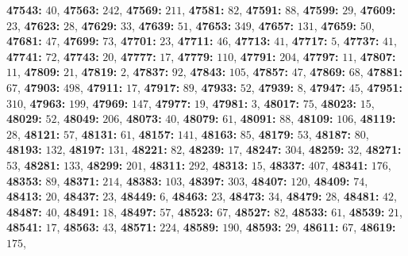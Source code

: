 \textsf{\bfseries 47543:} $40$, \textsf{\bfseries 47563:} $242$, \textsf{\bfseries 47569:} $211$, \textsf{\bfseries 47581:} $82$, \textsf{\bfseries 47591:} $88$, \textsf{\bfseries 47599:} $29$, \textsf{\bfseries 47609:} $23$, \textsf{\bfseries 47623:} $28$, \textsf{\bfseries 47629:} $33$, \textsf{\bfseries 47639:} $51$, \textsf{\bfseries 47653:} $349$, \textsf{\bfseries 47657:} $131$, \textsf{\bfseries 47659:} $50$, \textsf{\bfseries 47681:} $47$, \textsf{\bfseries 47699:} $73$, \textsf{\bfseries 47701:} $23$, \textsf{\bfseries 47711:} $46$, \textsf{\bfseries 47713:} $41$, \textsf{\bfseries 47717:} $5$, \textsf{\bfseries 47737:} $41$, \textsf{\bfseries 47741:} $72$, \textsf{\bfseries 47743:} $20$, \textsf{\bfseries 47777:} $17$, \textsf{\bfseries 47779:} $110$, \textsf{\bfseries 47791:} $204$, \textsf{\bfseries 47797:} $11$, \textsf{\bfseries 47807:} $11$, \textsf{\bfseries 47809:} $21$, \textsf{\bfseries 47819:} $2$, \textsf{\bfseries 47837:} $92$, \textsf{\bfseries 47843:} $105$, \textsf{\bfseries 47857:} $47$, \textsf{\bfseries 47869:} $68$, \textsf{\bfseries 47881:} $67$, \textsf{\bfseries 47903:} $498$, \textsf{\bfseries 47911:} $17$, \textsf{\bfseries 47917:} $89$, \textsf{\bfseries 47933:} $52$, \textsf{\bfseries 47939:} $8$, \textsf{\bfseries 47947:} $45$, \textsf{\bfseries 47951:} $310$, \textsf{\bfseries 47963:} $199$, \textsf{\bfseries 47969:} $147$, \textsf{\bfseries 47977:} $19$, \textsf{\bfseries 47981:} $3$, \textsf{\bfseries 48017:} $75$, \textsf{\bfseries 48023:} $15$, \textsf{\bfseries 48029:} $52$, \textsf{\bfseries 48049:} $206$, \textsf{\bfseries 48073:} $40$, \textsf{\bfseries 48079:} $61$, \textsf{\bfseries 48091:} $88$, \textsf{\bfseries 48109:} $106$, \textsf{\bfseries 48119:} $28$, \textsf{\bfseries 48121:} $57$, \textsf{\bfseries 48131:} $61$, \textsf{\bfseries 48157:} $141$, \textsf{\bfseries 48163:} $85$, \textsf{\bfseries 48179:} $53$, \textsf{\bfseries 48187:} $80$, \textsf{\bfseries 48193:} $132$, \textsf{\bfseries 48197:} $131$, \textsf{\bfseries 48221:} $82$, \textsf{\bfseries 48239:} $17$, \textsf{\bfseries 48247:} $304$, \textsf{\bfseries 48259:} $32$, \textsf{\bfseries 48271:} $53$, \textsf{\bfseries 48281:} $133$, \textsf{\bfseries 48299:} $201$, \textsf{\bfseries 48311:} $292$, \textsf{\bfseries 48313:} $15$, \textsf{\bfseries 48337:} $407$, \textsf{\bfseries 48341:} $176$, \textsf{\bfseries 48353:} $89$, \textsf{\bfseries 48371:} $214$, \textsf{\bfseries 48383:} $103$, \textsf{\bfseries 48397:} $303$, \textsf{\bfseries 48407:} $120$, \textsf{\bfseries 48409:} $74$, \textsf{\bfseries 48413:} $20$, \textsf{\bfseries 48437:} $23$, \textsf{\bfseries 48449:} $6$, \textsf{\bfseries 48463:} $23$, \textsf{\bfseries 48473:} $34$, \textsf{\bfseries 48479:} $28$, \textsf{\bfseries 48481:} $42$, \textsf{\bfseries 48487:} $40$, \textsf{\bfseries 48491:} $18$, \textsf{\bfseries 48497:} $57$, \textsf{\bfseries 48523:} $67$, \textsf{\bfseries 48527:} $82$, \textsf{\bfseries 48533:} $61$, \textsf{\bfseries 48539:} $21$, \textsf{\bfseries 48541:} $17$, \textsf{\bfseries 48563:} $43$, \textsf{\bfseries 48571:} $224$, \textsf{\bfseries 48589:} $190$, \textsf{\bfseries 48593:} $29$, \textsf{\bfseries 48611:} $67$, \textsf{\bfseries 48619:} $175$, 
